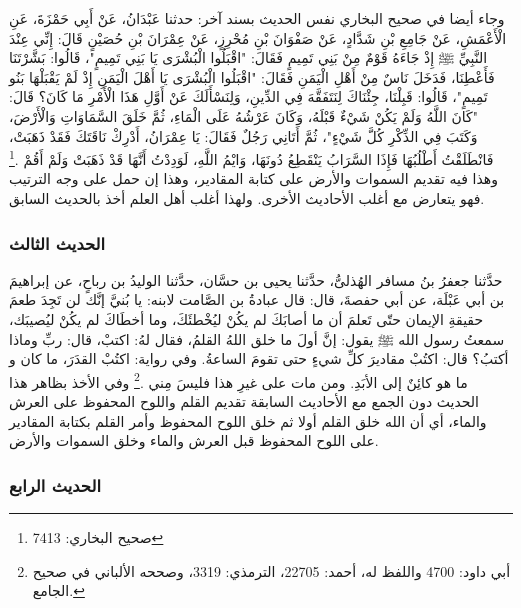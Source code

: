 وجاء أيضا في صحيح البخاري نفس الحديث بسند آخر:
حدثنا عَبْدَانُ، عَنْ أَبِي حَمْزَةَ، عَنِ الْأَعْمَشِ، عَنْ جَامِعِ بْنِ شَدَّادٍ، عَنْ صَفْوَانَ بْنِ مُحْرِزٍ، عَنْ عِمْرَانَ بْنِ حُصَيْنٍ قَالَ: إِنِّي عِنْدَ النَّبِيِّ ﷺ إِذْ جَاءَهُ قَوْمٌ مِنْ بَنِي تَمِيمٍ فَقَالَ: "اقْبَلُوا الْبُشْرَى يَا بَنِي تَمِيمٍ"، قَالُوا: بَشَّرْتَنَا فَأَعْطِنَا، فَدَخَلَ نَاسٌ مِنْ أَهْلِ الْيَمَنِ فَقَالَ: "اقْبَلُوا الْبُشْرَى يَا أَهْلَ الْيَمَنِ إِذْ لَمْ يَقْبَلْهَا بَنُو تَمِيمٍ"، قَالُوا: قَبِلْنَا، جِئْنَاكَ لِنَتَفَقَّهَ فِي الدِّينِ، وَلِنَسْأَلَكَ عَنْ أَوَّلِ هَذَا الْأَمْرِ مَا كَانَ؟ قَالَ: "كَانَ اللَّهُ وَلَمْ يَكُنْ شَيْءٌ قَبْلَهُ، وَكَانَ عَرْشُهُ عَلَى الْمَاءِ، ثُمَّ خَلَقَ السَّمَاوَاتِ وَالْأَرْضَ، وَكَتَبَ فِي الذِّكْرِ كُلَّ شَيْءٍ"، ثُمَّ أَتَانِي رَجُلٌ فَقَالَ: يَا عِمْرَانُ، أَدْرِكْ نَاقَتَكَ فَقَدْ ذَهَبَتْ، فَانْطَلَقْتُ أَطْلُبُهَا فَإِذَا السَّرَابُ يَنْقَطِعُ دُونَهَا، وَايْمُ اللَّهِ، لَوَدِدْتُ أَنَّهَا قَدْ ذَهَبَتْ وَلَمْ أَقُمْ \href{https://shamela.ws/book/1284/4624#p6}{\faExternalLink} \cite{bukhari}.\footnote{صحيح البخاري: 7413} وهذا فيه تقديم السموات والأرض على كتابة المقادير، وهذا إن حمل على وجه الترتيب فهو يتعارض مع أغلب الأحاديث الأخرى. ولهذا أغلب أهل العلم أخذ بالحديث السابق. 

\subsubsection{الحديث الثالث}
\label{sec:app_first_creation_hadith_3}

حدَّثنا جعفرُ بنُ مسافر الهُذلىُّ، حدَّثنا يحيى بن حسَّان، حدَّثنا الوليدُ بن رباحٍ، عن إبراهيمَ بن أبي عَبْلَة، عن أبي حفصةَ، قال: قال عبادةُ بن الصَّامت لابنه: يا بُنيَّ إنَّك لن تَجِدَ طعمَ حقيقةِ الإيمان حتّى تَعلمَ أن ما أصابَكَ لم يكُنْ ليُخْطئَكَ، وما أخطَاكَ لم يكُنْ ليُصيبَك، سمعتُ رسول الله ﷺ يقول: إنَّ أولَ ما خلق اللهُ القلمُ، فقال لهُ: اكتبْ، قال: ربِّ وماذا أكتبُ؟ قال: اكتُبْ مقاديرَ كلِّ شيءٍ حتى تقومَ الساعةُ. وفي رواية: اكتُبْ القدَرَ، ما كان و ما هو كائِنٌ إلى الأبَدِ. ومن مات على غيرِ هذا فليسَ مِني \href{https://shamela.ws/book/117359/3975#p2}{\faExternalLink} \cite{SunanAbiDawood}.\footnote{أبي داود: 4700 واللفظ له، أحمد: 22705، الترمذي: 3319، وصححه الألباني في صحيح الجامع.} وفي الأخذ بظاهر هذا الحديث دون الجمع مع الأحاديث السابقة تقديم القلم واللوح المحفوظ على العرش والماء، أي أن الله خلق القلم أولا ثم خلق اللوح المحفوظ وأمر القلم بكتابة المقادير على اللوح المحفوظ قبل العرش والماء وخلق السموات والأرض.

\subsubsection{الحديث الرابع}
\label{sec:app_first_creation_hadith_4}


